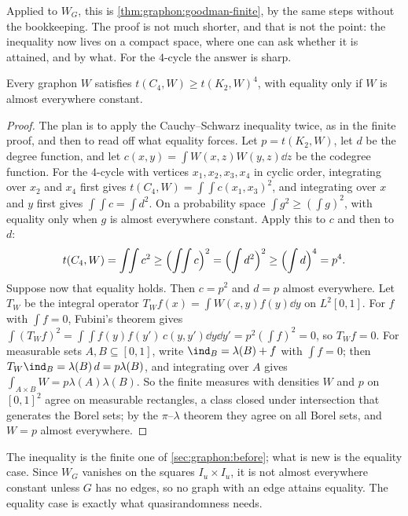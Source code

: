\begin{refsection}
Applied to $W_G$, this is \cref{thm:graphon:goodman-finite}, by the same steps without the bookkeeping. The proof is not much shorter, and that is not the point: the inequality now lives on a compact space, where one can ask whether it is attained, and by what. For the $4$-cycle the answer is sharp.

\begin{lemma}\label{lem:graphon:rigidity}
Every graphon $W$ satisfies $t(C_4,W)\ge t(K_2,W)^4$, with equality only if $W$ is almost everywhere constant.
\end{lemma}

\begin{proof}
The plan is to apply the Cauchy--Schwarz inequality twice, as in the finite proof, and then to read off what equality forces. Let $p=t(K_2,W)$, let $d$ be the degree function, and let $c(x,y)=\int W(x,z)W(y,z)\dd z$ be the codegree function. For the $4$-cycle with vertices $x_1,x_2,x_3,x_4$ in cyclic order, integrating over $x_2$ and $x_4$ first gives $t(C_4,W)=\int\!\!\int c(x_1,x_3)^2$, and integrating over $x$ and $y$ first gives $\int\!\!\int c=\int d^2$. On a probability space $\int g^2\ge(\int g)^2$, with equality only when $g$ is almost everywhere constant. Apply this to $c$ and then to $d$:
\[
  t(C_4,W)=\int\!\!\int c^2\ge\Bigl(\int\!\!\int c\Bigr)^2=\Bigl(\int d^2\Bigr)^2\ge\Bigl(\int d\Bigr)^4=p^4 .
\]
Suppose now that equality holds. Then $c=p^2$ and $d=p$ almost everywhere. Let $T_W$ be the integral operator $T_Wf(x)=\int W(x,y)f(y)\dd y$ on $L^2[0,1]$. For $f$ with $\int f=0$, Fubini's theorem gives $\int(T_Wf)^2=\int\!\!\int f(y)f(y')\,c(y,y')\dd y\dd y'=p^2(\int f)^2=0$, so $T_Wf=0$. For measurable sets $A,B\subseteq[0,1]$, write $\ind_B=\lambda(B)+f$ with $\int f=0$; then $T_W\ind_B=\lambda(B)\,d=p\lambda(B)$, and integrating over $A$ gives $\int_{A\times B}W=p\lambda(A)\lambda(B)$. So the finite measures with densities $W$ and $p$ on $[0,1]^2$ agree on measurable rectangles, a class closed under intersection that generates the Borel sets; by the $\pi$--$\lambda$ theorem they agree on all Borel sets, and $W=p$ almost everywhere.
\end{proof}

The inequality is the finite one of \cref{sec:graphon:before}; what is new is the equality case. Since $W_G$ vanishes on the squares $I_u\times I_u$, it is not almost everywhere constant unless $G$ has no edges, so no graph with an edge attains equality. The equality case is exactly what quasirandomness needs.


\end{refsection}
